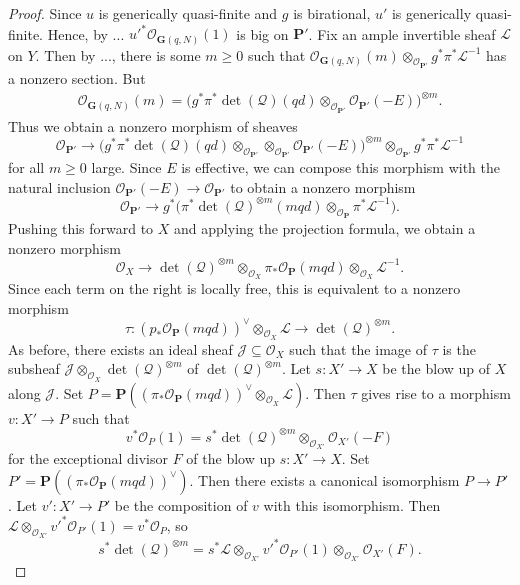 \begin{proof}
Since $u$ is generically quasi-finite and $g$ is birational,
$u'$ is generically quasi-finite.
Hence, by ...
$u'^*\mathcal{O}_{\mathbf{G}(q,N)}(1)$ is big
on $\mathbf{P}'$.
Fix an ample invertible sheaf $\mathcal{L}$ on $Y$.
Then by ..., there is some $m \geq 0$
such that
$\mathcal{O}_{\mathbf{G}(q,N)}(m)
  \otimes_{\mathcal{O}_{\mathbf{P}'}} g^*\pi^*\mathcal{L}^{-1}$
has a nonzero section.
But
\begin{align*}
  \mathcal{O}_{\mathbf{G}(q,N)}(m)
  = \big(g^*\pi^*\det(\mathcal{Q})(qd) \otimes_{\mathcal{O}_{\mathbf{P}'}}
    \mathcal{O}_{\mathbf{P}'}(-E)\big)^{\otimes m}.
\end{align*}
Thus we obtain a nonzero morphism of sheaves
$$
\mathcal{O}_{\mathbf{P}'} \to
    \big(g^*\pi^*\det(\mathcal{Q})(qd) \otimes_{\mathcal{O}_{\mathbf{P}'}}
      \otimes_{\mathcal{O}_{\mathbf{P}'}}
    \mathcal{O}_{\mathbf{P}'}(-E)\big)^{\otimes m}
      \otimes_{\mathcal{O}_{\mathbf{P}'}}
    g^*\pi^*\mathcal{L}^{-1}
$$
for all $m \geq 0$ large.
Since $E$ is effective, we can compose this morphism with the natural
inclusion $\mathcal{O}_{\mathbf{P}'}(-E) \to \mathcal{O}_{\mathbf{P}'}$
to obtain a nonzero morphism
$$
\mathcal{O}_{\mathbf{P}'} \to
    g^*\big(\pi^*\det(\mathcal{Q})^{\otimes m}(mqd)
      \otimes_{\mathcal{O}_{\mathbf{P}}}
    \pi^*\mathcal{L}^{-1}\big).
$$
Pushing this forward to $X$ and applying the projection formula, we obtain
a nonzero morphism
$$
\mathcal{O}_X \to
  \det(\mathcal{Q})^{\otimes m}
    \otimes_{\mathcal{O}_X}
  \pi_*\mathcal{O}_{\mathbf{P}}(mqd)
    \otimes_{\mathcal{O}_X}
  \mathcal{L}^{-1}.
$$
Since each term on the right is locally free, this is equivalent to a nonzero
morphism
$$
\tau :
  (p_*\mathcal{O}_{\mathbf{P}}(mqd))^\vee \otimes_{\mathcal{O}_X} \mathcal{L}
    \to \det(\mathcal{Q})^{\otimes m}.
$$
As before, there exists an ideal sheaf $\mathcal{J} \subseteq \mathcal{O}_X$
such that the image of $\tau$ is the subsheaf
$\mathcal{J} \otimes_{\mathcal{O}_X} \det(\mathcal{Q})^{\otimes m}$ of
$\det(\mathcal{Q})^{\otimes m}$.
Let $s : X' \to X$ be the blow up of $X$ along $\mathcal{J}$.
Set
$P = \mathbf{P}((\pi_*\mathcal{O}_{\mathbf{P}}(mqd))^\vee
        \otimes_{\mathcal{O}_X} \mathcal{L})$.
Then $\tau$ gives rise to a morphism
$v : X' \to P$
such that
$$
v^*\mathcal{O}_P(1) = s^*\det(\mathcal{Q})^{\otimes m}
                        \otimes_{\mathcal{O}_{X'}} \mathcal{O}_{X'}(-F)
$$
for the exceptional divisor $F$ of the blow up $s : X' \to X$.
Set $P' = \mathbf{P}((\pi_*\mathcal{O}_{\mathbf{P}}(mqd))^\vee)$.
Then there exists a canonical isomorphism
$P \to P'$.
Let $v' : X' \to P'$ be the composition of $v$ with this isomorphism.
Then
$
\mathcal{L} \otimes_{\mathcal{O}_{X'}} v'^* \mathcal{O}_{P'}(1)
  = v^* \mathcal{O}_P
$, so
$$
  s^*\det(\mathcal{Q})^{\otimes m}
    = s^*\mathcal{L}
        \otimes_{\mathcal{O}_{X'}} v'^* \mathcal{O}_{P'}(1)
        \otimes_{\mathcal{O}_{X'}} \mathcal{O}_{X'}(F).
$$


\end{proof}
